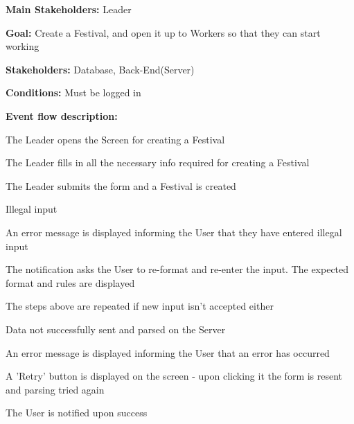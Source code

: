 				\noindent {}
				\begin{packed_item}
					\item \textbf{Main Stakeholders:} Leader
					\item \textbf{Goal:} Create a Festival, and open it up to Workers so that they can start working
					\item \textbf{Stakeholders:} Database, Back-End(Server)
					\item \textbf{Conditions:} Must be logged in
					\item \textbf{Event flow description: }
					\begin{packed_enum}
						\item The Leader opens the Screen for creating a Festival
						\item The Leader fills in all the necessary info required for creating a Festival
						\item The Leader submits the form and a Festival is created
					\end{packed_enum}
					
					\begin{packed_item}
						\item[2.a] Illegal input
						\item[] \begin{packed_enum}
							\item An error message is displayed informing the User that they have entered illegal input
							\item The notification asks the User to re-format and re-enter the input. The expected format and rules are displayed
							\item The steps above are repeated if new input isn't accepted either
						\end{packed_enum}
						
						\item[3.a] Data not successfully sent and parsed on the Server
						\item[] \begin{packed_enum}
							\item An error message is displayed informing the User that an error has occurred
							\item A 'Retry' button is displayed on the screen - upon clicking it the form is resent and parsing tried again
							\item The User is notified upon success
						\end{packed_enum}
					
					\end{packed_item}
				\end{packed_item}
					
